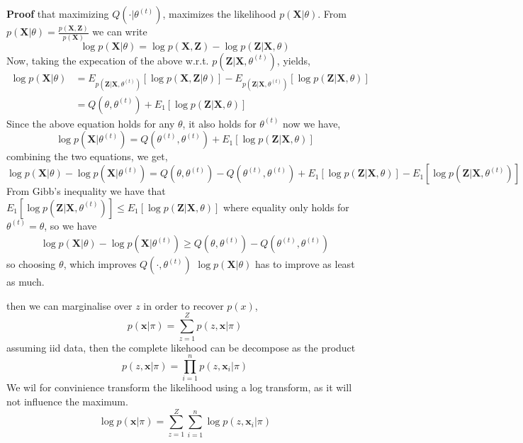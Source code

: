 \begin{testexample2}
    \textbf{Proof} that maximizing $Q(\cdot|\theta^{(t)})$, maximizes the likelihood
    $p(\textbf{X}|\theta)$. 
    From $p(\textbf{X}|\theta) = \frac{p(\textbf{X}, \textbf{Z})}{p(\textbf{X})}$ we can write
    $$\log p(\textbf{X}|\theta) = \log p(\textbf{X}, \textbf{Z}) - \log p(\textbf{Z}|\textbf{X},\theta)$$
    Now, taking the expecation of the above w.r.t. $p(\textbf{Z}|\textbf{X}, \theta^{(t)})$,
    yields,
    \begin{align*}
        \log p(\textbf{X}|\theta)  &= E_{p(\textbf{Z}|\textbf{X}, \theta^{(t)})}[\log p(\textbf{X}, \textbf{Z}|\theta)]
        -  E_{p(\textbf{Z}|\textbf{X}, \theta^{(t)})}[\log p(\textbf{Z}|\textbf{X},\theta)]\\
        &= Q(\theta,\theta^{(t)})+ E_1[\log p(\textbf{Z}|\textbf{X},\theta)]
    \end{align*} 
    Since the above equation holds for any $\theta$, it also holds for $\theta^{(t)}$
    now we have, 
    $$\log p(\textbf{X}|\theta^{(t)}) = Q(\theta^{(t)},\theta^{(t)})+ E_1[\log p(\textbf{Z}|\textbf{X},\theta)]$$
    combining the two equations, we get, 
    $$\log p(\textbf{X}|\theta) - \log p(\textbf{X}|\theta^{(t)}) = 
    Q(\theta,\theta^{(t)})
    -Q(\theta^{(t)},\theta^{(t)})+ E_1[\log p(\textbf{Z}|\textbf{X},\theta)]- E_1[\log p(\textbf{Z}|\textbf{X},\theta^{(t)})]$$
    From Gibb's inequality we have that $E_1[\log p(\textbf{Z}|\textbf{X},\theta^{(t)})]\leq E_1[\log p(\textbf{Z}|\textbf{X},\theta)]$
    where equality only holds for $\theta^{(t)} = \theta$, so we have
    \begin{align*}
        \log p(\textbf{X}|\theta) - \log p(\textbf{X}|\theta^{(t)}) \geq 
    Q(\theta,\theta^{(t)})
    -Q(\theta^{(t)},\theta^{(t)})
    \end{align*}
    so choosing $\theta$, which improves $Q(\cdot,\theta^{(t)})$ 
    $\log p(\textbf{X}|\theta) $ has to improve as least as much. 
\end{testexample2}


then we can marginalise over
    $z$ in order to recover $p(x)$, 
    $$p(\textbf{x}|\pi) = \sum_{z=1}^Z p(z,\textbf{x}|\pi) $$
    assuming iid data, then the complete likehood can be decompose as the product 
    $$ p(z,\textbf{x}|\pi) = \prod_{i=1}^n p(z,\textbf{x}_i|\pi)$$
    We wil for convinience transform the likelihood using a log transform, 
    as it will not influence the maximum. 
    $$\log p(\textbf{x}|\pi) = \sum_{z=1}^Z \sum_{i=1}^n \log p(z,\textbf{x}_i|\pi)$$



